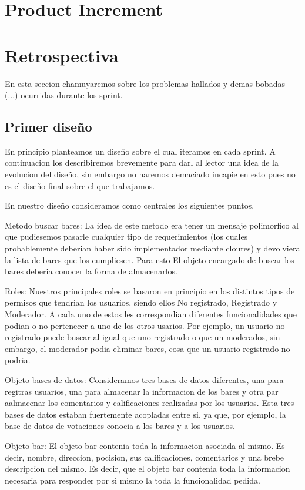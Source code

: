 \documentclass[10pt,a4paper]{article}
\begin{document}
\section{Product Increment}

\section{Retrospectiva}
En esta seccion chamuyaremos sobre los problemas hallados y demas bobadas (...) ocurridas durante los sprint.

\subsection{Primer diseño}

En principio planteamos un diseño sobre el cual iteramos en cada sprint. A continuacion los describiremos brevemente para darl al lector una idea de la evolucion del diseño, sin embargo
no haremos demaciado incapie en esto pues no es el diseño final sobre el que trabajamos.

En nuestro diseño consideramos como centrales los siguientes puntos. 

Metodo buscar bares: La idea de este metodo era tener un mensaje polimorfico al que pudiesemos pasarle cualquier tipo de
requerimientos (los cuales probablemente deberian haber sido implementador mediante cloures) y devolviera la lista de bares que los cumpliesen. Para esto El objeto encargado 
de buscar los bares deberia conocer la forma de almacenarlos.

Roles: Nuestros principales roles se basaron en principio en los distintos tipos de permisos que tendrian los usuarios, siendo ellos No registrado, Registrado y Moderador. A cada 
uno de estos les correspondian diferentes funcionalidades que podian o no pertenecer a uno de los otros usarios. Por ejemplo, un usuario no registrado puede buscar al igual que uno registrado
o que un moderados, sin embargo, el moderador podia eliminar bares, cosa que un usuario registrado no podria.

Objeto bases de datos: Consideramos tres bases de datos diferentes, una para regitras usuarios, una para almacenar la informacion de los bares y otra par aalmacenar los comentarios y calificaciones
realizadas por los usuarios. Esta tres bases de datos estaban fuertemente acopladas entre si, ya que, por ejemplo, la base de datos de votaciones conocia a los bares y a los usuarios.

Objeto bar: El objeto bar contenia toda la informacion asociada al mismo. Es decir, nombre, direccion, pocision, sus calificaciones, comentarios y una brebe descripcion del mismo. Es 
decir, que el objeto bar contenia toda la informacion necesaria para responder por si mismo la toda la funcionalidad pedida. 
\end{document}
